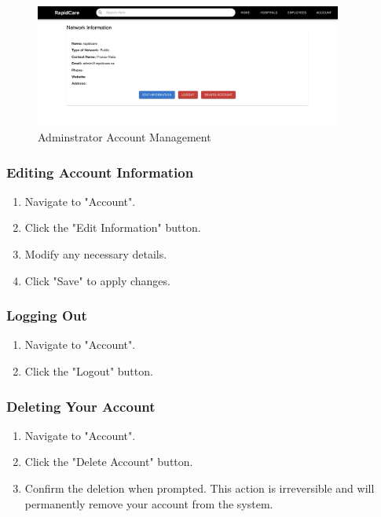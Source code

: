 \documentclass[12pt, titlepage]{article}
\begin{document}
\begin{figure}[H]
\centering
\includegraphics[width=0.9\textwidth]{account.png}
\caption{Adminstrator Account Management}
\label{fig:Adminstrator Account Management}
\end{figure}

\subsubsection{Editing Account Information}
\begin{enumerate}
    \item Navigate to "Account".
    \item Click the "Edit Information" button.
    \item Modify any necessary details.
    \item Click "Save" to apply changes.
\end{enumerate}

\subsubsection{Logging Out}
\begin{enumerate}
    \item Navigate to "Account".
    \item Click the "Logout" button.
\end{enumerate}

\subsubsection{Deleting Your Account}
\begin{enumerate}
    \item Navigate to "Account".
    \item Click the "Delete Account" button.
    \item Confirm the deletion when prompted. This action is irreversible and will permanently remove your account from the system.
\end{enumerate}
\end{document}
